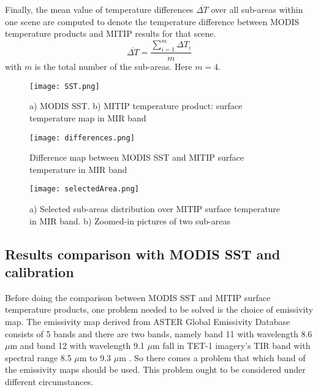 \noindent Finally, the mean value of temperature differences $\overline{\Delta T}$ over all sub-areas within one scene are computed to denote the temperature difference between MODIS temperature products and MITIP results for that scene.\\
\begin{equation}
\label{eq1}
\overline{\Delta T} =\frac{\sum_{i=1}^m \Delta T_i}{m}
\end{equation}
with $m$ is the total number of the sub-areas. Here $m = 4$.

\begin{figure}[!htbp]
\centering\texttt{[image: SST.png]}
\caption{a) MODIS SST. b) MITIP temperature product: surface temperature map in MIR band}
\label{fig:SST}
\end {figure}

\begin{figure}[!htbp]
\centering\texttt{[image: differences.png]}
\caption{Difference map between MODIS SST and MITIP surface temperature in MIR band}
\label{fig:Diff}
\end{figure}

\begin{figure}[!htbp]
\centering\texttt{[image: selectedArea.png]}
\caption{a) Selected sub-areas distribution over MITIP surface temperature in MIR band. b) Zoomed-in pictures of two sub-areas}
\label{fig:selectedArea}
\end{figure}


\subsection{Results comparison with MODIS SST and calibration}
Before doing the comparison between MODIS SST and MITIP surface temperature products, one problem needed to be solved is the choice of emissivity map. The emissivity map derived from ASTER Global Emissivity Database consists of 5 bands and there are two bands, namely band 11 with wavelength 8.6 $\mu$m and band 12 with wavelength 9.1 $\mu$m fall in TET-1 imagery's TIR band with spectral range 8.5 $\mu$m to 9.3 $\mu$m \parencite{Reference306}. So there comes a problem that which band of the emissivity maps should be used. This problem ought to be considered under different circumstances.\\

